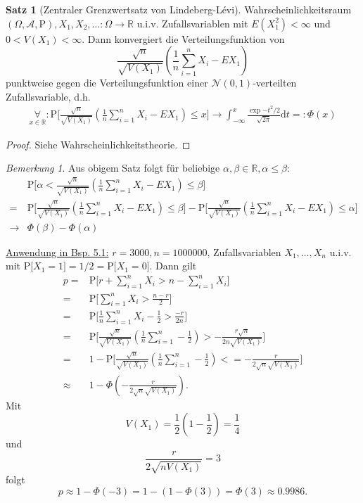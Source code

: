 \documentclass[a4paper,12pt,fleqn]{scrartcl}
\newcommand{\R}{\mathbb{R}}
\newcommand{\m}[1]{\mathcal{ #1 }}
\newcommand{\pe}[1]{\text{P[} #1 \text{]}}
\newcommand{\WR}{Wahrscheinlichkeitsraum}
\newcommand{\ZV}{Zufallsvariable}
\newcommand{\fa}[1]{\mathop{\forall}\limits_{#1}}
\theoremstyle{definition}
\newtheorem{satz}[definition]{Satz}
\theoremstyle{plain}
\theoremstyle{remark}
\newtheorem*{bemerkung}{Bemerkung}
\begin{document}
\begin{satz}[Zentraler Grenzwertsatz von Lindeberg-Lévi]
\WR $(\Omega,\m{A},\text{P}), X_1,X_2,\ldots:\Omega\to\R$ u.i.v. Zufallsvariablen mit $E(X_1^2)<\infty$ und $0<V(X_1)<\infty$. Dann konvergiert die Verteilungsfunktion von
\[\frac{\sqrt{n}}{\sqrt{V(X_1)}}(\frac{1}{n}\sum_{i=1}^nX_i-EX_1)\]
punktweise gegen die Verteilungsfunktion einer $\m{N}(0,1)$-verteilten \ZV, d.h.
\begin{align*}
\fa{x\in\R}:\pe{\frac{\sqrt{n}}{\sqrt{V(X_1)}}(\frac{1}{n}\sum_{i=1}^nX_i-EX_1)\leq x}\to\int_{-\infty}^x\frac{\exp{-t^2/2}}{\sqrt{2\pi}}\mathrm{d}t=:\Phi(x)
\end{align*}
\end{satz}
\begin{proof}
Siehe Wahrscheinlichkeitstheorie.
\end{proof}
\begin{bemerkung}
Aus obigem Satz folgt für beliebige $\alpha,\beta\in\R,\alpha\leq\beta$:
\begin{align*}
&\pe{\alpha<\frac{\sqrt{n}}{\sqrt{V(X_1)}}(\frac{1}{n}\sum_{i=1}^nX_i-EX_1)\leq\beta}\\
=&\pe{\frac{\sqrt{n}}{\sqrt{V(X_1)}}(\frac{1}{n}\sum_{i=1}^nX_i-EX_1)\leq\beta}-\pe{\frac{\sqrt{n}}{\sqrt{V(X_1)}}(\frac{1}{n}\sum_{i=1}^nX_i-EX_1)\leq\alpha}\\
\to&\Phi(\beta)-\Phi(\alpha)
\end{align*}
\end{bemerkung}
\underline{Anwendung in Bsp. 5.1:}
$r=3000,n=1000000$, Zufallsvariablen $X_1,\ldots,X_n$ u.i.v. mit $\pe{X_1=1}=1/2=\pe{X_1=0}$. Dann gilt
\begin{align*}
p=&\pe{r+\sum_{i=1}^nX_i>n-\sum_{i=1}^nX_i}\\
=&\pe{\sum_{i=1}^nX_i>\frac{n-r}{2}}\\
=&\pe{\frac{1}{n}\sum_{i=1}^nX_i-\frac{1}{2}>\frac{-r}{2n}}\\
=&\pe{\frac{\sqrt{n}}{\sqrt{V(X_1)}}(\frac{1}{n}\sum_{i=1}^n-\frac{1}{2})>-\frac{r\sqrt{n}}{2n\sqrt{V(X_1)}}}\\
=&1-\pe{\frac{\sqrt{n}}{\sqrt{V(X_1)}}(\frac{1}{n}\sum_{i=1}^n-\frac{1}{2})<=-\frac{r}{2\sqrt{n}\sqrt{V(X_1)}}}\\
\approx&1-\Phi(-\frac{r}{2\sqrt{n}\sqrt{V(X_1)}}).
\end{align*}
Mit
\[V(X_1)=\frac{1}{2}(1-\frac{1}{2})=\frac{1}{4}\]
und
\[\frac{r}{2\sqrt{nV(X_1)}}=3\]
folgt
\[p\approx 1-\Phi(-3)=1-(1-\Phi(3))=\Phi(3)\approx 0.9986.\]
\end{document}
